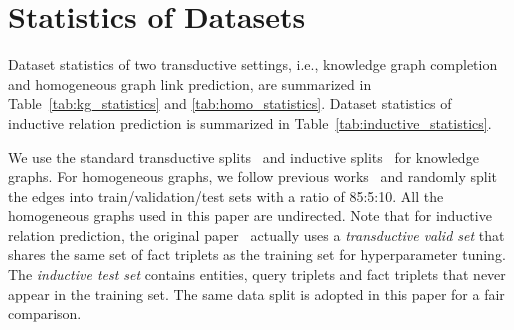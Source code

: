 \section{Statistics of Datasets}
\label{app:dataset_stat}

Dataset statistics of two transductive settings, i.e., knowledge graph completion and homogeneous graph link prediction, are summarized in Table~\ref{tab:kg_statistics} and \ref{tab:homo_statistics}. Dataset statistics of inductive relation prediction is summarized in Table~\ref{tab:inductive_statistics}.

We use the standard transductive splits~\cite{toutanova2015observed, dettmers2018convolutional} and inductive splits~\cite{teru2020inductive} for knowledge graphs. For homogeneous graphs, we follow previous works~\cite{kipf2016variational, davidson2018hyperspherical} and randomly split the edges into train/validation/test sets with a ratio of 85:5:10. All the homogeneous graphs used in this paper are undirected. Note that for inductive relation prediction, the original paper~\cite{teru2020inductive} actually uses a \emph{transductive valid set} that shares the same set of fact triplets as the training set for hyperparameter tuning. The \emph{inductive test set} contains entities, query triplets and fact triplets that never appear in the training set. The same data split is adopted in this paper for a fair comparison.

